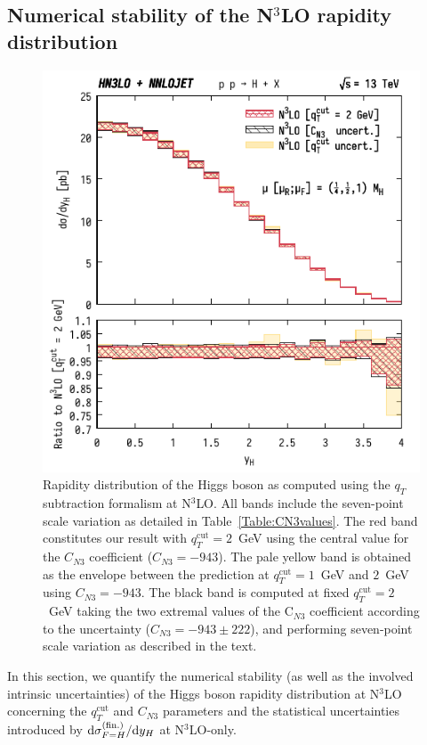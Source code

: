 \documentclass[12pt]{article}
\DeclareRobustCommand{\qt}{q_T}
\DeclareRobustCommand{\qtcut}{\ensuremath{q_T^\mathrm{cut}}}
\DeclareRobustCommand{\rd}{\ensuremath{\mathrm{d}}}
\begin{document}
\subsection{Numerical stability of the \texorpdfstring{N${}^\text{3}$LO}{N3LO} rapidity distribution}
\label{sec:N3LOrap}

\begin{figure}[tbh]
\centering
\includegraphics[width=.6\linewidth]{./new_figures/yH_B02_only_N3LO_qTcut_uncert_CN3_uncert}
\caption{\label{fig:yHN3LOonly}{Rapidity distribution of the Higgs boson as computed using the $\qt$ subtraction formalism at N$^{3}$LO. All bands include the seven-point scale variation as detailed in Table~\ref{Table:CN3values}. The red band constitutes our result with $\qtcut=2$~GeV using the central value for the $C_{N3}$ coefficient ($C_{N3}=-943$). The pale yellow band is obtained as the envelope between the prediction at $\qtcut=1$~GeV and $2$~GeV using $C_{N3}=-943$. The black band is computed at fixed $\qtcut=2$~GeV  taking the two extremal values of the C$_{N3}$ coefficient according to the uncertainty ($C_{N3}=-943 \pm 222$), and performing seven-point scale variation as described in the text.
}}
\end{figure}

In this section, we quantify the numerical stability (as well as the involved intrinsic uncertainties) of the Higgs boson rapidity distribution at N$^3$LO concerning the $\qtcut$ and $C_{N3}$ parameters and the statistical uncertainties introduced by $\rd\sigma_{F=H}^{(\rm fin.)}/\rd y_H$ at N$^3$LO-only.
\end{document}

